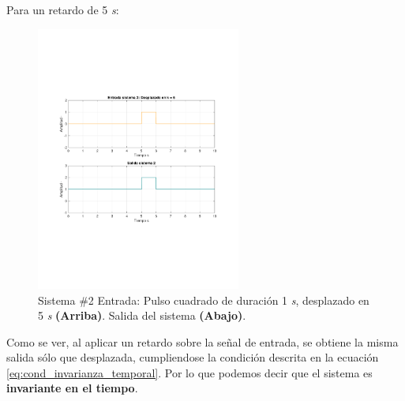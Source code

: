 				Para un retardo de 5 \textit{s}: 
				\begin{figure}[H]
					\center
					\includegraphics[width=0.6\textwidth,clip, trim = {2cm 7.0cm 2.2cm 7.0cm}]{../imgs/sistema_2_invarianza_temporal_retardo.pdf}
					\caption{Sistema \#2 Entrada: Pulso cuadrado de duración 1 \textit{s}, desplazado en 5 \textit{s} \textbf{(Arriba)}. Salida del sistema \textbf{(Abajo)}.}
					\label{fig:s_2_time_invariant_test_2}
				\end{figure}
			
				Como se ver, al aplicar un retardo sobre la señal de entrada, se obtiene la misma salida sólo que desplazada, cumpliendose la condición descrita en la ecuación \ref{eq:cond_invarianza_temporal}. Por lo que podemos decir que el sistema es \textbf{invariante en el tiempo}. 

\newpage

